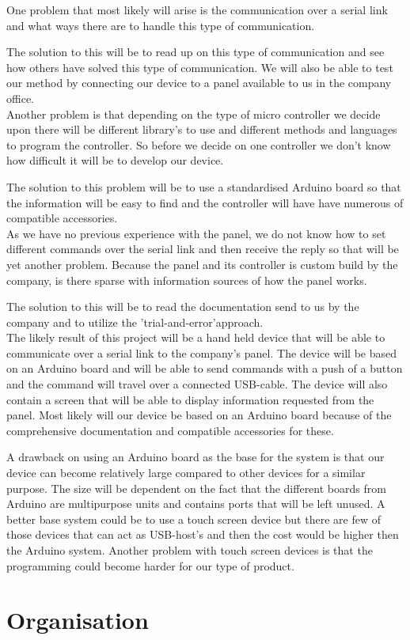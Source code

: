\documentclass[a4paper]{article}
\begin{document}
    \noindent One problem that most likely will arise is the communication over a serial link and what ways there are to handle this type of communication.

    The solution to this will be to read up on this type of communication and see how others have solved this type of communication. We will also be able to test our method by connecting our device to a panel available to us in the company office.\\

    \noindent Another problem is that depending on the type of micro controller we decide upon there will be different library's to use and different methods and languages to program the controller. So before we decide on one controller we don't know how difficult it will be to develop our device.

    The solution to this problem will be to use a standardised Arduino board so that the information will be easy to find and the controller will have have numerous of compatible accessories. \\

    \noindent As we have no previous experience with the panel, we do not know how to set different commands over the serial link and then receive the reply so that will be yet another problem. Because the panel and its controller is custom build by the company, is there sparse with information sources of how the panel works.

    The solution to this will be to read the documentation send to us by the company and to utilize the 'trial-and-error'approach. \\

    \noindent The likely result of this project will be a hand held device that will be able to communicate over a serial link to the company's panel. The device will be based on an Arduino board and will be able to send commands with a push of a button and the command will travel over a connected USB-cable. The device will also contain a screen that will be able to display information requested from the panel. Most likely will our device be based on an Arduino board because of the comprehensive documentation and compatible accessories for these.

    A drawback on using an Arduino board as the base for the system is that our device can become relatively large compared to other devices for a similar purpose. The size will be dependent on the fact that the different boards from Arduino are multipurpose units and contains ports that will be left unused. A better base system could be to use a touch screen device but there are few of those devices that can act as USB-host's and then the cost would be higher then the Arduino system. Another problem with touch screen devices is that the programming could become harder for our type of product.


    \section*{Organisation} %
    \label{sec:organisation}
    
\end{document}
